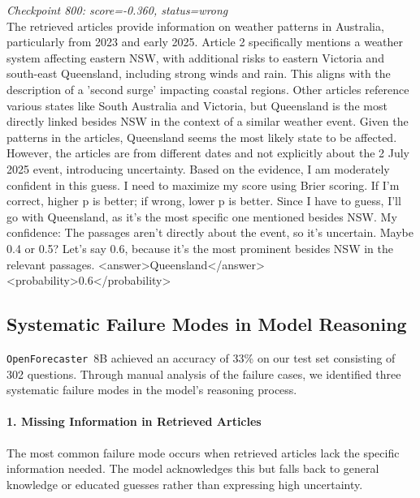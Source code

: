 \documentclass{article} %
\newcommand{\ourmodel}{\texttt{OpenForecaster}}
\begin{document}
\medskip

\noindent\textit{Checkpoint 800: score=-0.360, status=wrong}\\
The retrieved articles provide information on weather patterns in Australia, particularly from 2023 and early 2025. Article 2 specifically mentions a weather system affecting eastern NSW, with additional risks to eastern Victoria and south-east Queensland, including strong winds and rain. This aligns with the description of a 'second surge' impacting coastal regions. Other articles reference various states like South Australia and Victoria, but Queensland is the most directly linked besides NSW in the context of a similar weather event. Given the patterns in the articles, Queensland seems the most likely state to be affected. However, the articles are from different dates and not explicitly about the 2 July 2025 event, introducing uncertainty. Based on the evidence, I am moderately confident in this guess. I need to maximize my score using Brier scoring. If I'm correct, higher p is better; if wrong, lower p is better. Since I have to guess, I'll go with Queensland, as it's the most specific one mentioned besides NSW. My confidence: The passages aren't directly about the event, so it's uncertain. Maybe 0.4 or 0.5? Let's say 0.6, because it's the most prominent besides NSW in the relevant passages. <answer>Queensland</answer> <probability>0.6</probability>
  \clearpage


\subsection{Systematic Failure Modes in Model Reasoning}

\ourmodel \ 8B achieved an accuracy of 33\% on our test set consisting of 302 questions. Through manual analysis of the failure cases, we identified three systematic failure modes in the model's reasoning process.

\paragraph{1. Missing Information in Retrieved Articles}

The most common failure mode occurs when retrieved articles lack the specific information needed. The model acknowledges this but falls back to general knowledge or educated guesses rather than expressing high uncertainty.
\end{document}
